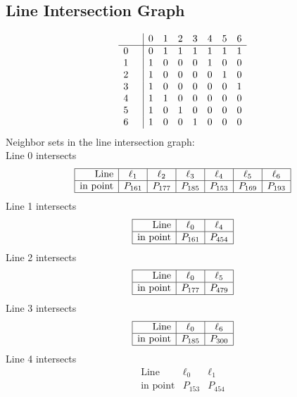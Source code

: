 \documentclass{article}
\begin{document}
{\subsection*{Line Intersection Graph}
{\arraycolsep=1pt
$$
\begin{array}{rr|*{7}r}
 &  & 0 & 1 & 2 & 3 & 4 & 5 & 6\\
\hline
0 &  & 0 & 1 & 1 & 1 & 1 & 1 & 1\\
1 &  & 1 & 0 & 0 & 0 & 1 & 0 & 0\\
2 &  & 1 & 0 & 0 & 0 & 0 & 1 & 0\\
3 &  & 1 & 0 & 0 & 0 & 0 & 0 & 1\\
4 &  & 1 & 1 & 0 & 0 & 0 & 0 & 0\\
5 &  & 1 & 0 & 1 & 0 & 0 & 0 & 0\\
6 &  & 1 & 0 & 0 & 1 & 0 & 0 & 0\\
\end{array}
$$
}%
Neighbor sets in the line intersection graph:\\
Line 0 intersects 
$$
\begin{array}{|r*{6}{|c}|}
\hline
\mbox{Line}  & \ell_{1} & \ell_{2} & \ell_{3} & \ell_{4} & \ell_{5} & \ell_{6}\\
\hline
\mbox{in point}  & P_{161} & P_{177} & P_{185} & P_{153} & P_{169} & P_{193}\\
\hline
\end{array}
$$
Line 1 intersects 
$$
\begin{array}{|r*{2}{|c}|}
\hline
\mbox{Line}  & \ell_{0} & \ell_{4}\\
\hline
\mbox{in point}  & P_{161} & P_{454}\\
\hline
\end{array}
$$
Line 2 intersects 
$$
\begin{array}{|r*{2}{|c}|}
\hline
\mbox{Line}  & \ell_{0} & \ell_{5}\\
\hline
\mbox{in point}  & P_{177} & P_{479}\\
\hline
\end{array}
$$
Line 3 intersects 
$$
\begin{array}{|r*{2}{|c}|}
\hline
\mbox{Line}  & \ell_{0} & \ell_{6}\\
\hline
\mbox{in point}  & P_{185} & P_{300}\\
\hline
\end{array}
$$
Line 4 intersects 
$$
\begin{array}{|r*{2}{|c}|}
\hline
\mbox{Line}  & \ell_{0} & \ell_{1}\\
\hline
\mbox{in point}  & P_{153} & P_{454}\\

\end{array}$$}
\end{document}
